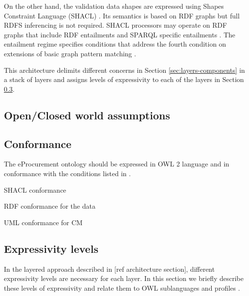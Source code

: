 	On the other hand, the validation data shapes are expressed using Shapes Constraint Language (SHACL) \cite{shacl-spec}. Its semantics is based on RDF graphs but full RDFS inferencing is not required. SHACL processors may operate on RDF graphs that include RDF entailments \citep{rdf11-semantics} and SPARQL specific entailments \citep{sparql11-entailment}. The entailment regime specifies conditions that address the fourth condition on extensions of basic graph pattern matching \citep{rdf-semantics,rdf11-semantics}. 
	
	This architecture delimits different concerns in Section \ref{sec:layers-components} in a stack of layers and assigns levels of expressivity to each of the layers in Section \ref{sec:expressivity}.
	
	\subsection{Open/Closed world assumptions}
	\label{sec:world-assumption}


	\subsection{Conformance}
	
	The eProcurement ontology should be expressed in OWL 2 language and in conformance with the conditions listed in \citet{owl2-comformance}.
	
	SHACL conformance
	
	RDF conformance for the data
	
	UML conformance for CM
	
	\subsection{Expressivity levels}
	\label{sec:expressivity}

	In the layered approach described in [ref architecture section], different expressivity levels are necessary for each layer. In this section we briefly describe these levels of expressivity and relate them to OWL sublanguages \citep{owl1} and profiles \citep{owl2-profiles}.
	
